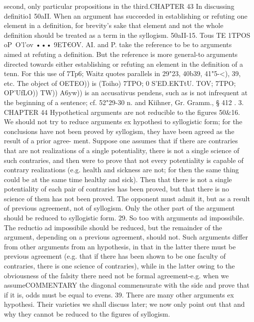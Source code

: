 {{{{{{{{{{{{{{{{{{{{{{{{{{{{{{{{{{{{{second, only particular propositions in the third.CHAPTER 43
In discussing definitio1%
50aII. When an argument has succeeded in establishing or
refuting one element in a definition, for brevity's sake that element
and not the whole definition should be treated as a term in the
syllogism.
50aII-15. Tous TE 1TPOS oP~O'l'ov ••• 9ET€OV. AI. and P. take
the reference to be to arguments aimed at refuting a definition.
But the reference is more general-to arguments directed towards
either establishing or refuting an element in the definition of
a tenn. For this use of 7Tp6; Waitz quotes parallels in 29"23,
40b39, 41"5-<), 39, etc. The object of OETEO)) is (Toiho) 7TPO; 0
S'ED.EKTtU. TOV; 7TPO; OP'UfLO)) TW)) A6yw)) is an accusativus pendens,
such as is not infrequent at the beginning of a sentence; cf.
52"29-30 n. and Kiihner, Gr. Gramm., § 412 . 3.
CHAPTER 44
Hypothetical arguments are not reducible to the figures
50&16. We should not try to reduce arguments ex hypothesi to
syllogistic form; for the conclusions have not been proved by
syllogism, they have been agreed as the result of a prior agree-
ment. Suppose one assumes that if there are contraries that are
not realizations of a single potentiality, there is not a single
science of such contraries, and then were to prove that not every
potentiality is capable of contrary realizations (e.g. health and
sickness are not; for then the same thing could be at the same
time healthy and sick). Then that there is not a single potentiality
of each pair of contraries has been proved, but that there is no
science of them has not been proved. The opponent must admit it,
but as a result of previous agreement, not of syllogism. Only the
other part of the argument should be reduced to syllogistic form.
29. So too with arguments ad impossibile. The reductio ad
impossibile should be reduced, but the remainder of the argument,
depending on a previous agreement, should not. Such arguments
differ from other arguments from an hypothesis, in that in the
latter there must be previous agreement (e.g. that if there has
been shown to be one faculty of contraries, there is one science of
contraries), while in the latter owing to the obviousness of the
falsity there need not be formal agreement-e.g. when we assumeCOMMENTARY
the diagonal commensurate with the side and prove that if it is,
odds must be equal to evens.
39. There are many other arguments ex hypothesi. Their
varieties we shall discuss later; we now only point out that and
why they cannot be reduced to the figures of syllogism.
}}}}}}}}}}}}}}}}}}}}}}}}}}}}}}}}}}}}}
